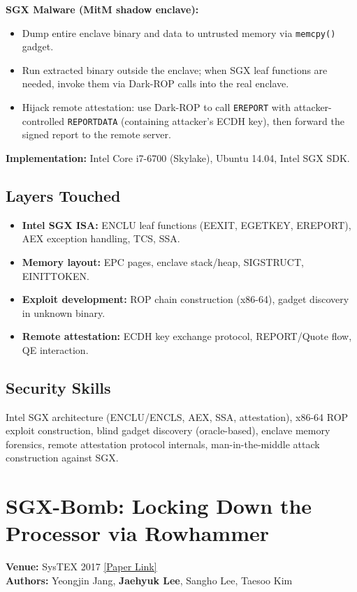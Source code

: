 \documentclass[11pt,letterpaper]{article}
\begin{document}
\textbf{SGX Malware (MitM shadow enclave):}
\begin{itemize}
    \item Dump entire enclave binary and data to untrusted memory via \texttt{memcpy()} gadget.
    \item Run extracted binary outside the enclave; when SGX leaf functions are needed, invoke them via Dark-ROP calls into the real enclave.
    \item Hijack remote attestation: use Dark-ROP to call \texttt{EREPORT} with attacker-controlled \texttt{REPORTDATA} (containing attacker's ECDH key), then forward the signed report to the remote server.
\end{itemize}

\textbf{Implementation:} Intel Core i7-6700 (Skylake), Ubuntu 14.04, Intel SGX SDK.

\subsection*{Layers Touched}
\begin{itemize}
    \item \textbf{Intel SGX ISA:} ENCLU leaf functions (EEXIT, EGETKEY, EREPORT), AEX exception handling, TCS, SSA.
    \item \textbf{Memory layout:} EPC pages, enclave stack/heap, SIGSTRUCT, EINITTOKEN.
    \item \textbf{Exploit development:} ROP chain construction (x86-64), gadget discovery in unknown binary.
    \item \textbf{Remote attestation:} ECDH key exchange protocol, REPORT/Quote flow, QE interaction.
\end{itemize}

\subsection*{Security Skills}
Intel SGX architecture (ENCLU/ENCLS, AEX, SSA, attestation), x86-64 ROP exploit construction, blind gadget discovery (oracle-based), enclave memory forensics, remote attestation protocol internals, man-in-the-middle attack construction against SGX.

\newpage

\section{SGX-Bomb: Locking Down the Processor via Rowhammer}
\textbf{Venue:} SysTEX 2017 \hfill
\href{https://www.unexploitable.systems/uploads/jang:sgx-bomb.pdf}{[Paper Link]}\\
\textbf{Authors:} Yeongjin Jang, \textbf{Jaehyuk Lee}, Sangho Lee, Taesoo Kim
\end{document}
